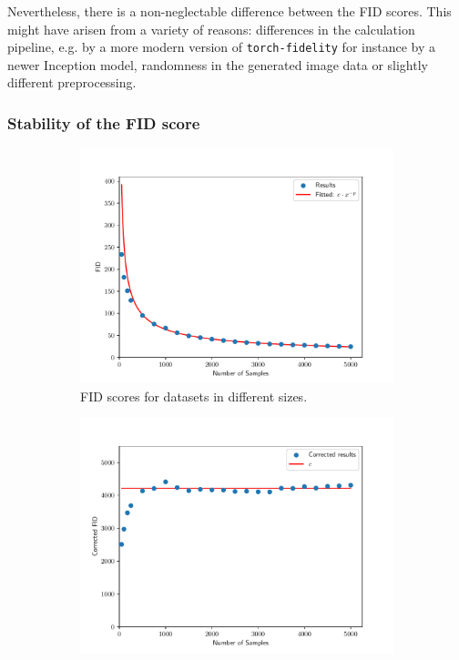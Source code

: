 \documentclass[11pt]{article}
\begin{document}
Nevertheless, there is a non-neglectable difference between the FID scores. This might have arisen from a variety of reasons: differences in the calculation pipeline, e.g. by a more modern version of \texttt{torch-fidelity} for instance by a newer Inception model, randomness in the generated image data or slightly different preprocessing.

\subsubsection{Stability of the FID score}
\begin{figure}
    \centering
    \begin{subfigure}{0.4\textwidth}
        \includegraphics[width=\textwidth]{assets/num_samples_comparison.pdf}
        \caption{FID scores for datasets in different sizes.}
        \label{fig:num_samples_comparison}
    \end{subfigure}
    \hfill
    \begin{subfigure}{0.4\textwidth}
        \includegraphics[width=\textwidth]{assets/num_samples_comparison_corrected.pdf}

\end{subfigure}
\end{figure}
\end{document}
